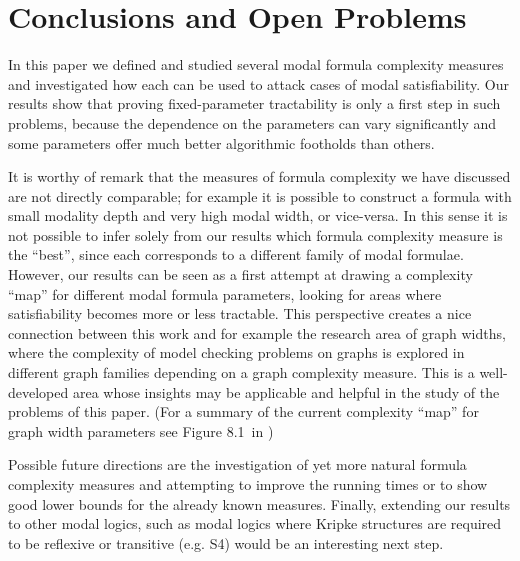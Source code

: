 \documentclass{llncs}
\begin{document}
\section{Conclusions and Open Problems}

In this paper we defined and studied several modal formula
complexity measures and investigated how each can be used to attack
cases of modal satisfiability. Our results show that proving
fixed-parameter tractability is only a first step in such problems,
because the dependence on the parameters can vary significantly and
some parameters offer much better algorithmic footholds than others.

It is worthy of remark that the measures of formula complexity we have
discussed are not directly comparable; for example it is possible to construct
a formula with small modality depth and very high modal width, or vice-versa.
In this sense it is not possible to infer solely from our results which formula
complexity measure is the ``best'', since each corresponds to a different
family of modal formulae. However, our results can be seen as a first attempt
at drawing a complexity ``map'' for different modal formula parameters, looking
for areas where satisfiability becomes more or less tractable. This perspective
creates a nice connection between this work and for example the research area
of graph widths, where the complexity of model checking problems on graphs is
explored in different graph families depending on a graph complexity measure.
This is a well-developed area whose insights may be applicable and helpful in
the study of the problems of this paper. (For a summary of the current
complexity ``map'' for graph width parameters see Figure 8.1\ in \cite{DBLP:journals/eccc/Grohe07})


Possible future directions are the investigation of yet more natural formula
complexity measures and attempting to improve the running times or to show good
lower bounds for the already known measures. Finally, extending our results to
other modal logics, such as modal logics where Kripke structures are required
to be reflexive or transitive (e.g. S4) would be an interesting next step.




 
\end{document}
